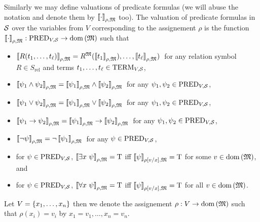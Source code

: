 \begin{definition}
  Similarly we may define valuations of predicate formulas (we will abuse the
  notation and denote them by $\substitute{\cdot}{\rho, \structure{M}}$ too).
  The valuation of predicate formulas in $\signature{S}$ over the variables from
  $V$ corresponding to the assignement $\rho$ is the function
  $\substitute{\cdot}{\rho, \structure{M}} :
    \pred{V}{\signature{S}} \to \domain{\structure{M}}$ such that
  \begin{itemize}
    \item $\substitute{R(t_1, \dots, t_\ell)}{\rho, \structure{M}} = 
      R^{\structure{M}}(
        \substitute{t_1}{\rho, \structure{M}}),
        \dots,
        \substitute{t_\ell}{\rho, \structure{M}})
      $\,
      for any relation symbol $R \in S_\mathrm{rel}$ 
      and terms $t_1, \dots, t_\ell \in \term{V}{\signature{S}}$,
    \item 
      $
        \substitute{\psi_1 \land \psi_2}{\rho, \structure{M}} = 
        \substitute{\psi_1}{\rho, \structure{M}} \land
        \substitute{\psi_2}{\rho, \structure{M}}
      $\,
      for any $\psi_1, \psi_2 \in \pred{V}{\signature{S}}$,
    \item 
      $
        \substitute{\psi_1 \lor \psi_2}{\rho, \structure{M}} = 
        \substitute{\psi_1}{\rho, \structure{M}} \lor
        \substitute{\psi_2}{\rho, \structure{M}}
      $\,
      for any $\psi_1, \psi_2 \in \pred{V}{\signature{S}}$,
    \item 
      $
        \substitute{\psi_1 \limplies \psi_2}{\rho, \structure{M}} = 
        \substitute{\psi_1}{\rho, \structure{M}} \limplies
        \substitute{\psi_2}{\rho, \structure{M}}
      $\,
      for any $\psi_1, \psi_2 \in \pred{V}{\signature{S}}$,
    \item 
      $
        \substitute{\lnot \psi}{\rho, \structure{M}} = 
        \lnot \substitute{\psi_1}{\rho, \structure{M}}
      $\,
      for any $\psi \in \pred{V}{\signature{S}}$,
    \item for $\psi \in \pred{V}{\signature{S}}$,
      $
        \substitute{\exists x \  \psi}{\rho, \structure{M}} = 
        \ltrue  
      $ iff 
      $\substitute{\psi}{\assign{\rho}{x}{v}, \structure{M}} = \ltrue$
      for some $v \in \domain{\structure{M}}$, and
    \item for $\psi \in \pred{V}{\signature{S}}$,
      $
        \substitute{\forall x \  \psi}{\rho, \structure{M}} = 
        \ltrue  
      $ iff 
      $\substitute{\psi}{\assign{\rho}{x}{v}, \structure{M}} = \ltrue$
      for all $v \in \domain{\structure{M}}$.
  \end{itemize}

  Let $V = \set{x_1, \dots, x_n}$ then we denote the assignement $\rho : V \to
  \domain{\structure{M}}$ such that $\rho(x_i) = v_i$ by 
  $x_1 = v_1, \dots, x_n = v_n$.
\end{definition}


